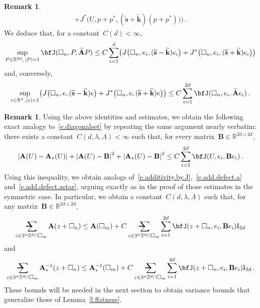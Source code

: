 \documentclass[11pt,twoside]{article} %
\makeatletter
\let\oldsquare\square %
\renewcommand{\square}{\oldsquare}
\numberwithin{equation}{section}
\theoremstyle{definition}
\newtheorem{remark}[theorem]{Remark}
\let\originalleft\left
\let\originalright\right
\renewcommand{\left}{\mathopen{}\mathclose\bgroup\originalleft}
\renewcommand{\right}{\aftergroup\egroup\originalright}
\newcommand*{\Itwod}{\ensuremath{\mathrm{I}_{2d}}}
\newcommand*{\R}{\ensuremath{\mathbb{R}}}
\newcommand*{\Zd}{\ensuremath{\mathbb{Z}^d}}
\newcommand*{\Rd}{\ensuremath{\mathbb{R}^d}}
\renewcommand*{\tilde}{\widetilde}
\newcommand{\cu}{\square}
\newcommand{\avsum}{\mathop{\mathpalette\avsuminner\relax}\displaylimits}
\newcommand\avsuminner[2]{%
  {\sbox0{$\m@th#1\sum$}%
   \vphantom{\usebox0}%
   \ooalign{%
     \hidewidth
     \smash{\,\rule[.23em]{8.8pt}{1.1pt} \relax}%
     \hidewidth\cr
   ~$\m@th#1\sum$\cr
   }%
  }%
}
\newcommand{\bfA}{\mathbf{A}}
\makeatother
\begin{document}
\begin{remark}
\begin{align}
+ 
J^*\bigl(U,p+p^*,
(\tilde{\mathbf{s}}+\tilde{\mathbf{k}}) (p+p^*)  \bigr) 
\bigr )
\,.
\end{align}
We deduce that, for a constant~$C(d)<\infty$, 
\begin{equation}
\label{e.bfJ.to.JJstar.minset}
\sup_{P\in \R^{2d}, \, |P|=1}
\bfJ(\cu_n,P, \tilde{\mathbf{A}} P) 
\leq 
C
\sum_{i=1}^d
\bigl ( 
 J\bigl (\cu_n,e_i,(\tilde{\mathbf{s}}-\tilde{\mathbf{k}}) e_i\bigr ) +  J^*\bigl (\cu_n,e_i,(\tilde{\mathbf{s}}+\tilde{\mathbf{k}}) e_i\bigr )
\bigr )
\end{equation}
and, conversely,
\begin{equation}
\label{e.bfJ.to.JJstar.minset.2}
\sup_{e\in\Rd\,, |e|=1} 
\bigl ( 
 J\bigl (\cu_n,e,(\tilde{\mathbf{s}}-\tilde{\mathbf{k}}) e \bigr ) +  J^*\bigl (\cu_n,e,(\tilde{\mathbf{s}}+\tilde{\mathbf{k}}) e\bigr )
\bigr )
\leq 
C
\sum_{i=1}^{2d} 
\bfJ(\cu_n,e_i, \tilde{\mathbf{A}} e_i) 
\,.
\end{equation}
\end{remark}


\begin{remark}
Using the above identities and estimates, we obtain the following exact analogy to~\eqref{e.diagonalset} by repeating the same argument nearly verbatim: there exists a constant~$C(d,\lambda,\Lambda)<\infty$ such that, for every matrix~$\mathbf{B} \in \R^{2d\times2d}$, 
\begin{equation} 
\label{e.diagonalset.bigA}
\left| \bfA(U) - \bfA_*(U) \right| 
+
\left| \bfA(U) - \mathbf{B} \right|^2 
+
\left| \bfA_*(U) - \mathbf{B} \right|^2 
\leq C \sum_{i=1}^{2d} \bfJ(U,e_i,\mathbf{B} e_i)
\,. 
\end{equation}
Using this inequality, we obtain analogs of~\eqref{e.additivity.by.J},~\eqref{e.add.defect.a} and~\eqref{e.add.defect.astar}, arguing exactly as in the proof of those estimates in the symmetric case. In particular, we obtain a constant~$C(d,\lambda,\Lambda)$ such that, for any matrix~$\mathbf{B}\in\R^{2d\times2d}$, 
\begin{equation}
\label{e.add.defect.a.nosymm}
\avsum_{z\in 3^n\Zd \cap \cu_m} 
\bfA(z+\cu_n) 
\leq 
\bfA(\cu_m) + C \avsum_{z\in 3^n\Zd\cap \cu_m}
\sum_{i=1}^{2d} 
\bfJ(z+\cu_n,e_i,\mathbf{B} e_i)
\Itwod
\end{equation}
and
\begin{equation}
\label{e.add.defect.astar.nosymm}
\avsum_{z\in 3^n\Zd \cap \cu_m} 
\bfA_*^{-1}(z+\cu_n) 
\leq 
\bfA_*^{-1} (\cu_m) + C \avsum_{z\in 3^n\Zd\cap \cu_m}
\sum_{i=1}^{2d} 
\bfJ(z+\cu_n,e_i,\mathbf{B} e_i) \Itwod \,.
\end{equation}
These bounds will be needed in the next section to obtain variance bounds that generalize those of Lemma~\ref{l.flatness}. 
\end{remark} 
\end{document}
